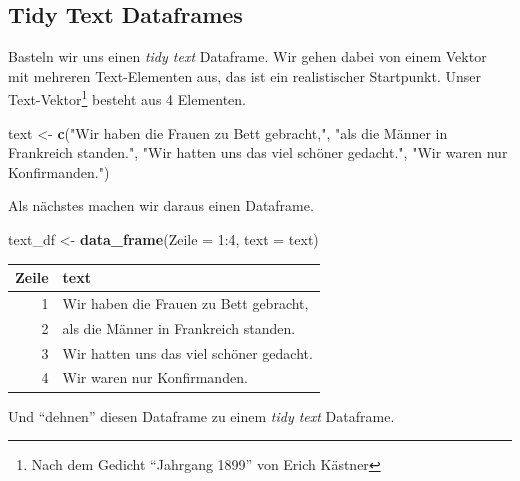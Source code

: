 \documentclass[12pt,ngerman,]{book}
\makeatletter
\newenvironment{Shaded}{\begin{snugshade}}{\end{snugshade}}
\newcommand{\KeywordTok}[1]{\textcolor[rgb]{0.13,0.29,0.53}{\textbf{{#1}}}}
\newcommand{\DataTypeTok}[1]{\textcolor[rgb]{0.13,0.29,0.53}{{#1}}}
\newcommand{\DecValTok}[1]{\textcolor[rgb]{0.00,0.00,0.81}{{#1}}}
\newcommand{\StringTok}[1]{\textcolor[rgb]{0.31,0.60,0.02}{{#1}}}
\newcommand{\CommentTok}[1]{\textcolor[rgb]{0.56,0.35,0.01}{\textit{{#1}}}}
\newcommand{\NormalTok}[1]{{#1}}
\let\rmarkdownfootnote\footnote%
\def\footnote{\protect\rmarkdownfootnote}
\newenvironment{kframe}{%
\medskip{}
\setlength{\fboxsep}{.8em}
 \def\at@end@of@kframe{}%
 \ifinner\ifhmode%
  \def\at@end@of@kframe{\end{minipage}}%
  \begin{minipage}{\columnwidth}%
 \fi\fi%
 \def\FrameCommand##1{\hskip\@totalleftmargin \hskip-\fboxsep
 \colorbox{shadecolor}{##1}\hskip-\fboxsep
     \hskip-\linewidth \hskip-\@totalleftmargin \hskip\columnwidth}%
 \MakeFramed {\advance\hsize-\width
   \@totalleftmargin\z@ \linewidth\hsize
   \@setminipage}}%
 {\par\unskip\endMakeFramed%
 \at@end@of@kframe}
\renewenvironment{Shaded}{\begin{kframe}}{\end{kframe}}
\theoremstyle{definition}
\theoremstyle{definition}
\theoremstyle{remark}
\makeatother
\begin{document}
\subsection{Tidy Text Dataframes}\label{tidy-text-dataframes}

Basteln wir uns einen \emph{tidy text} Dataframe. Wir gehen dabei von
einem Vektor mit mehreren Text-Elementen aus, das ist ein realistischer
Startpunkt. Unser Text-Vektor\footnote{Nach dem Gedicht ``Jahrgang
  1899'' von Erich Kästner} besteht aus 4 Elementen.

\begin{Shaded}
\begin{Highlighting}[]
\NormalTok{text <-}\StringTok{ }\KeywordTok{c}\NormalTok{(}\StringTok{"Wir haben die Frauen zu Bett gebracht,"}\NormalTok{,}
          \StringTok{"als die Männer in Frankreich standen."}\NormalTok{,}
          \StringTok{"Wir hatten uns das viel schöner gedacht."}\NormalTok{,}
          \StringTok{"Wir waren nur Konfirmanden."}\NormalTok{)}
\end{Highlighting}
\end{Shaded}

Als nächstes machen wir daraus einen Dataframe.

\begin{Shaded}
\begin{Highlighting}[]
\NormalTok{text_df <-}\StringTok{ }\KeywordTok{data_frame}\NormalTok{(}\DataTypeTok{Zeile =} \DecValTok{1}\NormalTok{:}\DecValTok{4}\NormalTok{,}
                      \DataTypeTok{text =} \NormalTok{text)}
\end{Highlighting}
\end{Shaded}

\begin{tabular}{r|l}
\hline
Zeile & text\\
\hline
1 & Wir haben die Frauen zu Bett gebracht,\\
\hline
2 & als die Männer in Frankreich standen.\\
\hline
3 & Wir hatten uns das viel schöner gedacht.\\
\hline
4 & Wir waren nur Konfirmanden.\\
\hline
\end{tabular}

Und ``dehnen'' diesen Dataframe zu einem \emph{tidy text} Dataframe.

\begin{Shaded}
\end{Shaded}
\end{document}
